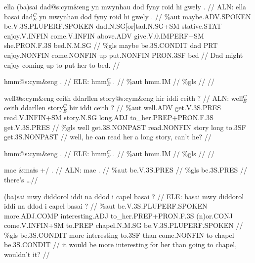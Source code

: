 \documentclass[a4paper,10pt]{article}
\begin{document}
\ex
\begingl[lingstyle=gergl]
\glchat ella (ba)sai dad@s:cym\&eng yn mwynhau dod fyny roid hi gwely . //
\glsurface ALN:  ella basai dad$^{C}_{E}$ yn mwynhau dod fyny roid hi gwely .  //
\glauto \%aut  maybe{\scriptsize .ADV.SPOKEN} be{\scriptsize .V.3S.PLUPERF.SPOKEN} dad{\scriptsize .N.SG[or]tad.N.SG+SM} stative{\scriptsize .STAT} enjoy{\scriptsize .V.INFIN} come{\scriptsize .V.INFIN} above{\scriptsize .ADV} give{\scriptsize .V.0.IMPERF+SM} she{\scriptsize .PRON.F.3S} bed{\scriptsize .N.M.SG}   //
\glmanual \%gls  maybe be{\scriptsize .3S.CONDIT} dad PRT enjoy{\scriptsize .NONFIN} come{\scriptsize .NONFIN} up put{\scriptsize .NONFIN} PRON{\scriptsize .3SF} bed   //
\gleng Dad might enjoy coming up to put her to bed. //
\endgl
\xe

\ex
\begingl[lingstyle=gergl]
\glchat hmm@s:cym\&eng . //
\glsurface ELE:  hmm$^{C}_{E}$ .  //
\glauto \%aut  hmm{\scriptsize .IM}   //
\glmanual \%gls     //
\gleng  //
\endgl
\xe

\ex
\begingl[lingstyle=gergl]
\glchat well@s:cym\&eng ceith ddarllen story@s:cym\&eng hir iddi ceith ? //
\glsurface ALN:  well$^{C}_{E}$ ceith ddarllen story$^{C}_{E}$ hir iddi ceith ?  //
\glauto \%aut  well{\scriptsize .ADV} get{\scriptsize .V.3S.PRES} read{\scriptsize .V.INFIN+SM} story{\scriptsize .N.SG} long{\scriptsize .ADJ} to\_her{\scriptsize .PREP+PRON.F.3S} get{\scriptsize .V.3S.PRES}   //
\glmanual \%gls  well get{\scriptsize .3S.NONPAST} read{\scriptsize .NONFIN} story long to{\scriptsize .3SF} get{\scriptsize .3S.NONPAST}   //
\gleng well, he can read her a long story, can't he? //
\endgl
\xe

\ex
\begingl[lingstyle=gergl]
\glchat hmm@s:cym\&eng . //
\glsurface ELE:  hmm$^{C}_{E}$ .  //
\glauto \%aut  hmm{\scriptsize .IM}   //
\glmanual \%gls     //
\gleng  //
\endgl
\xe

\ex
\begingl[lingstyle=gergl]
\glchat mae \&maɨs +/ . //
\glsurface ALN:  mae .  //
\glauto \%aut  be{\scriptsize .V.3S.PRES}   //
\glmanual \%gls  be{\scriptsize .3S.PRES}   //
\gleng there's \dots  //
\endgl
\xe

\ex
\begingl[lingstyle=gergl]
\glchat (ba)sai mwy diddorol iddi na ddod i capel basai ? //
\glsurface ELE:  basai mwy diddorol iddi na ddod i capel basai ?  //
\glauto \%aut  be{\scriptsize .V.3S.PLUPERF.SPOKEN} more{\scriptsize .ADJ.COMP} interesting{\scriptsize .ADJ} to\_her{\scriptsize .PREP+PRON.F.3S} (n)or{\scriptsize .CONJ} come{\scriptsize .V.INFIN+SM} to{\scriptsize .PREP} chapel{\scriptsize .N.M.SG} be{\scriptsize .V.3S.PLUPERF.SPOKEN}   //
\glmanual \%gls  be{\scriptsize .3S.CONDIT} more interesting to{\scriptsize .3SF} than come{\scriptsize .NONFIN} to chapel be{\scriptsize .3S.CONDIT}   //
\gleng it would be more interesting for her than going to chapel, wouldn't it? //
\endgl
\xe
\end{document}
